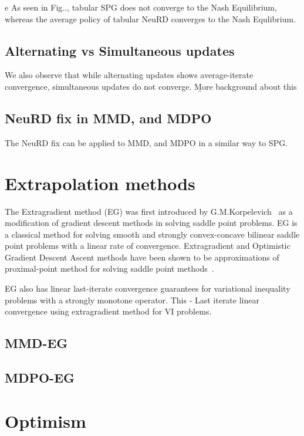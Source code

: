 e As seen in Fig.., tabular SPG does not converge to the Nash Equilibrium, 
whereas the average policy of tabular NeuRD converges to the Nash Equlibrium.

\subsection{Alternating vs Simultaneous updates}

We also observe that while alternating updates shows average-iterate convergence, simultaneous updates do not converge.
\b{More background about this}

\subsection{NeuRD fix in MMD, and MDPO}
The NeuRD fix can be applied to MMD, and MDPO in a similar way to SPG.


\section{Extrapolation methods}

The Extragradient method (EG) was first introduced by
G.M.Korpelevich~\cite{korpelevichextragradient1976} as a modification of gradient descent methods
in solving saddle point problems.
EG is a classical method for solving smooth and strongly convex-concave bilinear saddle
point problems with a linear rate of convergence.
Extragradient and Optimistic Gradient Descent Ascent methods have been shown to be approximations
of proximal-point method for solving saddle point methods~\cite{mokhtariUnified2020}.

EG also has linear last-iterate convergence guarantees for variational inequality problems with a 
strongly monotone operator. This 
\cite{tsenglinear1995} - Last iterate linear convergence using extragradient method for VI problems.

\subsection{MMD-EG}

\subsection{MDPO-EG}

\section{Optimism}


